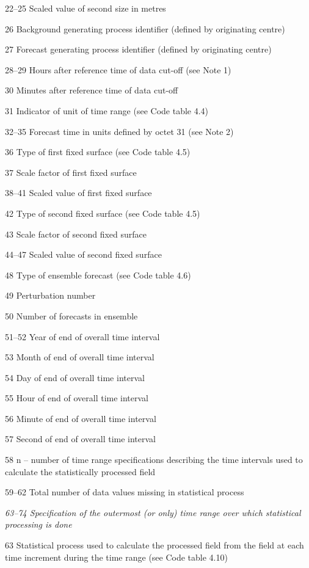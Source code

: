 22--25 Scaled value of second size in metres

26 Background generating process identifier (defined by originating centre)

27 Forecast generating process identifier (defined by originating centre)

28--29 Hours after reference time of data cut-off (see Note 1)

30 Minutes after reference time of data cut-off

31 Indicator of unit of time range (see Code table 4.4)

32--35 Forecast time in units defined by octet 31 (see Note 2)

36 Type of first fixed surface (see Code table 4.5)

37 Scale factor of first fixed surface

38--41 Scaled value of first fixed surface

42 Type of second fixed surface (see Code table 4.5)

43 Scale factor of second fixed surface

44--47 Scaled value of second fixed surface

48 Type of ensemble forecast (see Code table 4.6)

49 Perturbation number

50 Number of forecasts in ensemble

51--52 Year of end of overall time interval

53 Month of end of overall time interval

54 Day of end of overall time interval

55 Hour of end of overall time interval

56 Minute of end of overall time interval

57 Second of end of overall time interval

58 n -- number of time range specifications describing the time intervals used to\\
calculate the statistically processed field

59--62 Total number of data values missing in statistical process

\emph{63--74 Specification of the outermost (or only) time range over which statistical}\\
\emph{processing is done}

63 Statistical process used to calculate the processed field from the field at each\\
time increment during the time range (see Code table 4.10)

